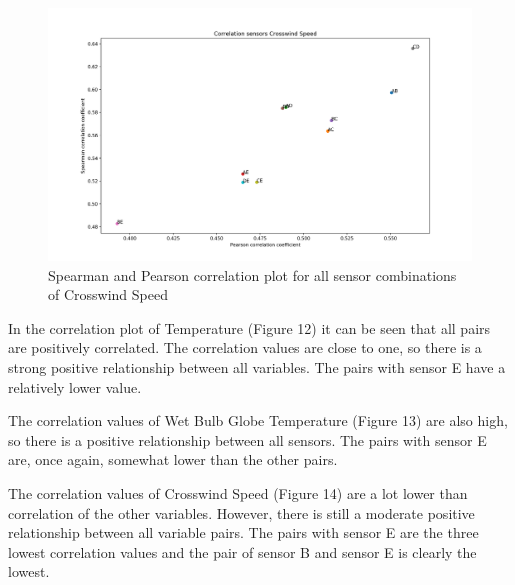\documentclass{article}
\begin{document}
        \begin{figure}[H]
            \includegraphics[width=\textwidth]{cor_cwindspeed}
            \caption{Spearman and Pearson correlation plot for all sensor combinations of Crosswind Speed}
        \end{figure}

        In the correlation plot of Temperature (Figure 12) it can be seen that all pairs are positively
        correlated. The correlation values are close to one, so there is a strong positive relationship
        between all variables. The pairs with sensor E have a relatively lower value.
        \par The correlation values of Wet Bulb Globe Temperature (Figure 13) are also high, so there is a positive
        relationship between all sensors. The pairs with sensor E are, once again, somewhat lower than
        the other pairs.
        \par The correlation values of Crosswind Speed (Figure 14) are a lot lower than correlation of 
        the other variables. However, there is still a moderate positive relationship between all 
        variable pairs. The pairs with sensor E are the three lowest correlation values and the pair
        of sensor B and sensor E is clearly the lowest.
    
\end{document}
